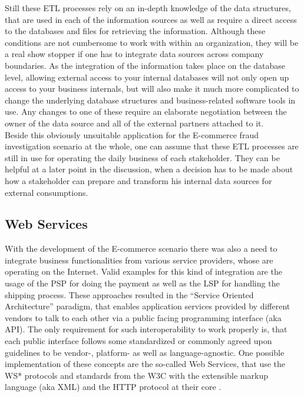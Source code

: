 Still these \gls{ETL} processes rely on an in-depth knowledge of the data structures, that are used in each of the information sources as well as require a direct access to the databases and files for retrieving the information. Although these conditions are not cumbersome to work with within an organization, they will be a real show stopper if one has to integrate data sources across company boundaries. As the integration of the information takes place on the database level, allowing external access to your internal databases will not only open up access to your business internals, but will also make it much more complicated to change the underlying database structures and business-related software tools in use. Any changes to one of these require an elaborate negotiation between the owner of the data source and all of the external partners attached to it. \\

Beside this obviously unsuitable application for the \gls{E-commerce} fraud investigation scenario at the whole, one can assume that these \gls{ETL} processes are still in use for operating the daily business of each stakeholder. They can be helpful at a later point in the discussion, when a decision has to be made about how a stakeholder can prepare and transform his internal data sources for external consumptions.


\subsection{Web Services}
\label{subsec:web_services}

With the development of the \gls{E-commerce} scenario there was also a need to integrate business functionalities from various service providers, whose are operating on the Internet. Valid examples for this kind of integration are the usage of the \gls{PSP} for doing the payment as well as the \gls{LSP} for handling the shipping process. These approaches resulted in the ``Service Oriented Architecture'' paradigm, that enables application services provided by different vendors to talk to each other via a public facing programming interface (aka \gls{API}). The only requirement for such interoperability to work properly is, that each public interface follows some standardized or commonly agreed upon guidelines to be vendor-, platform- as well as language-agnostic. One possible implementation of these concepts are the so-called Web Services, that use the WS* protocols and standards from the \gls{W3C} with the extensible markup language (aka \gls{XML}) and the \gls{HTTP} protocol at their core \citep{josuttis2007soa}. \\

